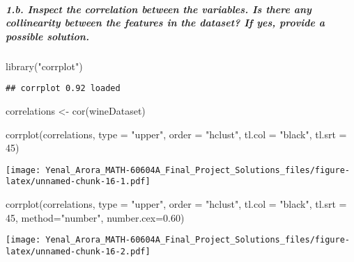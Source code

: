 \documentclass[
]{article}
\newenvironment{Shaded}{\begin{snugshade}}{\end{snugshade}}
\newcommand{\AttributeTok}[1]{\textcolor[rgb]{0.77,0.63,0.00}{#1}}
\newcommand{\DecValTok}[1]{\textcolor[rgb]{0.00,0.00,0.81}{#1}}
\newcommand{\FloatTok}[1]{\textcolor[rgb]{0.00,0.00,0.81}{#1}}
\newcommand{\FunctionTok}[1]{\textcolor[rgb]{0.00,0.00,0.00}{#1}}
\newcommand{\NormalTok}[1]{#1}
\newcommand{\OtherTok}[1]{\textcolor[rgb]{0.56,0.35,0.01}{#1}}
\newcommand{\StringTok}[1]{\textcolor[rgb]{0.31,0.60,0.02}{#1}}
\begin{document}
\hypertarget{b.-inspect-the-correlation-between-the-variables.-is-there-any-collinearity-between-the-features-in-the-dataset-if-yes-provide-a-possible-solution.}{%
\subparagraph{1.b. Inspect the correlation between the variables. Is
there any collinearity between the features in the dataset? If yes,
provide a possible
solution.}\label{b.-inspect-the-correlation-between-the-variables.-is-there-any-collinearity-between-the-features-in-the-dataset-if-yes-provide-a-possible-solution.}}

\begin{Shaded}
\begin{Highlighting}[]
\FunctionTok{library}\NormalTok{(}\StringTok{"corrplot"}\NormalTok{)}
\end{Highlighting}
\end{Shaded}

\begin{verbatim}
## corrplot 0.92 loaded
\end{verbatim}

\begin{Shaded}
\begin{Highlighting}[]
\NormalTok{correlations }\OtherTok{\textless{}{-}} \FunctionTok{cor}\NormalTok{(wineDataset)}

\FunctionTok{corrplot}\NormalTok{(correlations, }\AttributeTok{type =} \StringTok{"upper"}\NormalTok{, }\AttributeTok{order =} \StringTok{"hclust"}\NormalTok{, }
         \AttributeTok{tl.col =} \StringTok{"black"}\NormalTok{, }\AttributeTok{tl.srt =} \DecValTok{45}\NormalTok{)}
\end{Highlighting}
\end{Shaded}

\texttt{[image: Yenal\_Arora\_MATH-60604A\_Final\_Project\_Solutions\_files/figure-latex/unnamed-chunk-16-1.pdf]}

\begin{Shaded}
\begin{Highlighting}[]
\FunctionTok{corrplot}\NormalTok{(correlations, }\AttributeTok{type =} \StringTok{"upper"}\NormalTok{,  }\AttributeTok{order =} \StringTok{"hclust"}\NormalTok{, }
         \AttributeTok{tl.col =} \StringTok{"black"}\NormalTok{, }\AttributeTok{tl.srt =} \DecValTok{45}\NormalTok{, }\AttributeTok{method=}\StringTok{"number"}\NormalTok{, }\AttributeTok{number.cex=}\FloatTok{0.60}\NormalTok{)}
\end{Highlighting}
\end{Shaded}

\texttt{[image: Yenal\_Arora\_MATH-60604A\_Final\_Project\_Solutions\_files/figure-latex/unnamed-chunk-16-2.pdf]}
\end{document}
